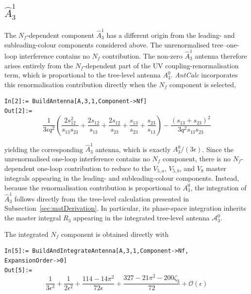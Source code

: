 \subsection{$\hat A_3^1$}\label{subsec:A31nf}

The $N_f$-dependent component $\hat A_3^1$ has a different origin from the
leading- and subleading-colour components considered above. The unrenormalised
tree--one-loop interference contains no $N_f$ contribution. The non-zero
$\hat A_3^1$ antenna therefore arises entirely from the $N_f$-dependent part of
the UV coupling-renormalisation term, which is proportional to the tree-level
antenna $A_3^0$. \textit{AntCalc} incorporates this renormalisation contribution
directly when the $N_f$ component is selected,

\begin{mdframed}[backgroundcolor=gray!10, linewidth=0pt]
\texttt{In[2]:= BuildAntenna[A,3,1,Component->Nf]}\\
\hfill
\texttt{Out[2]:=}
    \begin{equation*}
        \frac{1}{3\epsilon q^2}\!\left(\frac{2s_{12}^2}{s_{13}s_{23}}+\frac{2s_{12}}{s_{13}}+\frac{2s_{12}}{s_{23}}+\frac{s_{13}}{s_{23}}+\frac{s_{23}}{s_{13}}\right)-\frac{\left(s_{13}+s_{23}\right)^2}{3q^2s_{13}s_{23}}
    \end{equation*}
\end{mdframed}

yielding the corresponding $\hat A_3^1$ antenna, which is exactly $A_3^0/(3\epsilon)$. Since the unrenormalised
one-loop interference contains no $N_f$ component, there is no $N_f$-dependent
one-loop contribution to reduce to the $V_{5,a}$, $V_{5,b}$, and $V_8$ master
integrals appearing in the leading- and subleading-colour components. Instead,
because the renormalisation contribution is proportional to $A_3^0$, the integration
of $\hat A_3^1$ follows directly from the tree-level calculation presented in
Subsection~\ref{sec:matDerivation}. In particular, its phase-space integration inherits
the master integral $R_3$ appearing in the integrated tree-level antenna
$\mathcal A_3^0$.

The integrated $N_f$ component is obtained directly with

\begin{mdframed}[backgroundcolor=gray!10, linewidth=0pt]
\texttt{In[5]:= BuildAndIntegrateAntenna[A,3,1,Component->Nf,\\ExpansionOrder->0]}\\
\hfill
\texttt{Out[5]:=}
    \begin{equation*}
        \frac1{3\epsilon^3}+\frac1{2\epsilon^2}+\frac{114-14\pi^2}{72\epsilon}+\frac{327-21\pi^2-200\zeta_3}{72}+\mathcal O(\epsilon)
    \end{equation*}
\end{mdframed}

